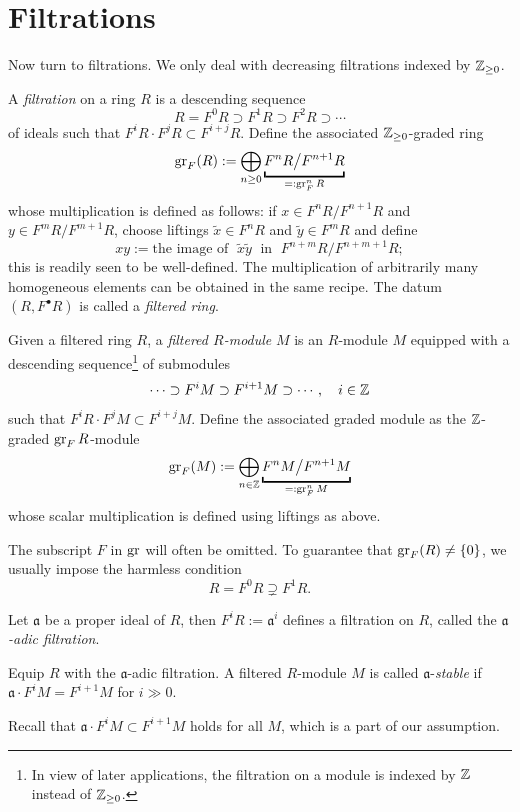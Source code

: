 \section{Filtrations}
Now turn to filtrations. We only deal with decreasing filtrations indexed by $\mathbb{Z}_{\geq 0}$.
\begin{definition}
	A \emph{filtration} on a ring $R$ is a descending sequence
	\[ R = F^0 R \supset F^1 R \supset F^2 R \supset \cdots \]
	of ideals such that $F^i R \cdot F^j R \subset F^{i+j} R$. Define the associated $\mathbb{Z}_{\geq 0}$-graded ring
	\[ \gr_F(R) := \bigoplus_{n \geq 0} \underbracket{F^n R \big/ F^{n+1} R}_{=: \gr_F^n R} \]
	whose multiplication is defined as follows: if $x \in F^n R / F^{n+1} R$ and $y \in F^m R/F^{m+1} R$, choose liftings $\tilde{x} \in F^n R$ and $\tilde{y} \in F^m R$ and define
	\[ xy := \text{the image of }\; \tilde{x}\tilde{y}\; \text{ in }\; F^{n+m} R / F^{n+m+1} R; \]
	this is readily seen to be well-defined. The multiplication of arbitrarily many homogeneous elements can be obtained in the same recipe. The datum $(R, F^\bullet R)$ is called a \emph{filtered ring}.

	Given a filtered ring $R$, a \emph{filtered $R$-module} $M$ is an $R$-module $M$ equipped with a descending sequence\footnote{In view of later applications, the filtration on a module is indexed by $\mathbb{Z}$ instead of $\mathbb{Z}_{\geq 0}$.} of submodules
	\[ \cdots \supset F^i M \supset F^{i+1} M \supset \cdots, \quad i \in \mathbb{Z} \]
	such that $F^i R \cdot F^j M \subset F^{i+j} M$. Define the associated graded module as the $\mathbb{Z}$-graded $\operatorname{gr}_F R$-module
	\[ \gr_F(M) := \bigoplus_{n \in \Z} \underbracket{F^n M \big/ F^{n+1} M}_{=: \gr_F^n M} \]
	whose scalar multiplication is defined using liftings as above.
\end{definition}

The subscript $F$ in $\operatorname{gr}$ will often be omitted. To guarantee that $\operatorname{gr}_F(R) \neq \{0\}$, we usually impose the harmless condition
\[ R = F^0 R \supsetneq F^1 R. \]

\begin{example}
	Let $\mathfrak{a}$ be a proper ideal of $R$, then $F^i R := \mathfrak{a}^i$ defines a filtration on $R$, called the \emph{$\mathfrak{a}$-adic filtration}.
\end{example}

\begin{definition}\label{def:a-stable}
	Equip $R$ with the $\mathfrak{a}$-adic filtration. A filtered $R$-module $M$ is called $\mathfrak{a}$-\emph{stable} if $\mathfrak{a} \cdot F^i M = F^{i+1} M$ for $i \gg 0$.
\end{definition}
Recall that $\mathfrak{a} \cdot F^i M \subset F^{i+1} M$ holds for all $M$, which is a part of our assumption.

